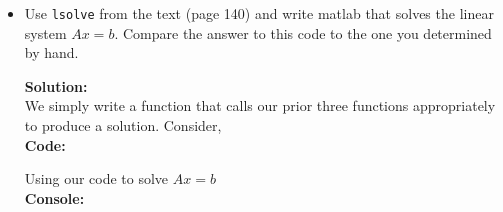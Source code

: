 \documentclass[12pt]{article}
\makeatletter
\theoremstyle{homework}
\newenvironment{exercise}[1]
{\def\@currentlabel{#1}\exercisecore}
{\endexercisecore}
\newcommand{\localhead}[1]{\par\smallskip\noindent\textbf{#1}\nobreak\\}%
\newcommand\solution{\localhead{Solution:}}
\makeatother
\begin{document}
\begin{exercise} {Problem 7.3 [Modified]}
\begin{itemize}
	Note that the code on page 140 is being sneaky.  Rather than building two matrices, it builds just one. Since $L$ always has 1s on the diagonal, it only has interesting entries below the diagonal.  And since $U$ is all zeros below the diagonal, there's space there to store the entries of $L$!  This is an important space saving technique when the matrices involved are large: no need to go around working with extra matrices that are half zeros and use up twice the needed storage.  But for the purposes of this exercise and clarity,
	we'll return $L$ and $U$ separately.\\

	\textbf{Code:}
	\begin{center}
		
	\end{center}
	Testing our code with the 3x3 matrix presented in class.\\

	\textbf{Console:}
	\begin{center}
		
	\end{center}
\vspace{.25in}

	\item Use {\tt lsolve} from the text (page 140) and write matlab that solves the linear system 
	$Ax = b$. Compare the answer to this code to the one you determined by hand.

	\solution We simply write a function that calls our prior three functions appropriately to produce a solution. Consider,\\

	\textbf{Code:}

	
	\begin{center}
		
	\end{center}

	Using our code to solve $Ax = b$\\

	\textbf{Console:}
	\begin{center}
		
	\end{center}

\end{itemize}
\end{exercise}

\vspace{1in}
\end{document}
